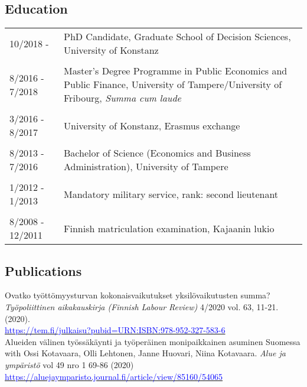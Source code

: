 \documentclass[16pt]{article}
\begin{document}
\subsection*{Education}
\begin{tabular}{@{}p{1.5in}p{5in}}
10/2018 -          & PhD Candidate, Graduate School of Decision Sciences, University of Konstanz \\
                        
\\
8/2016 - 7/2018 & Master's Degree Programme in Public Economics and Public Finance, University of Tampere/University of Fribourg, \textit{Summa cum laude}\\
\\
3/2016 - 8/2017 & University of Konstanz, Erasmus exchange \\
\\
8/2013 - 7/2016 & Bachelor of Science (Economics and Business Administration), University of Tampere\\
\\
1/2012 - 1/2013 & Mandatory military service, rank: second lieutenant\\
\\
8/2008 - 12/2011 & Finnish matriculation examination, Kajaanin lukio
\end{tabular}

\subsection*{Publications}

\noindent Ovatko ty\"{o}tt\"{o}myysturvan kokonaisvaikutukset yksil\"{o}vaikutusten summa?
\noindent  \textit{Ty\"{o}poliittinen aikakauskirja (Finnish Labour Review)} 4/2020 vol. 63, 11-21.  (2020). \\ \href{https://tem.fi/julkaisu?pubid=URN:ISBN:978-952-327-583-6} {\textcolor{blue}{https://tem.fi/julkaisu?pubid=URN:ISBN:978-952-327-583-6}}\\

\noindent Alueiden v\"{a}linen ty\"{o}ss\"{a}k\"{a}ynti ja ty\"{o}per\"{a}inen monipaikkainen asuminen Suomessa \\
\noindent with Ossi Kotavaara, Olli Lehtonen, Janne Huovari, Niina Kotavaara. \textit{Alue ja ympäristö} vol 49 nro 1 69-86 (2020) \href{https://aluejaymparisto.journal.fi/article/view/85160/54065}{\textcolor{blue}{https://aluejaymparisto.journal.fi/article/view/85160/54065}} \\
 
\end{document}
